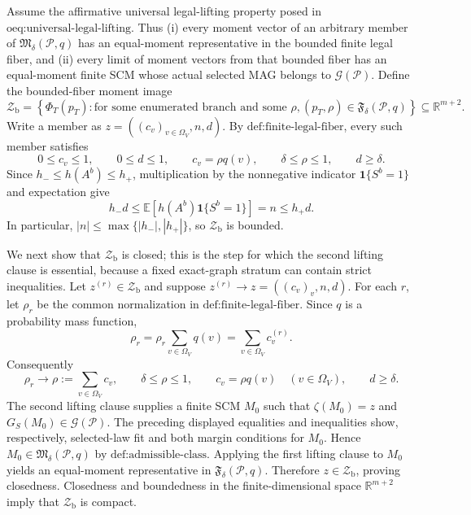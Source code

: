 Assume the affirmative universal legal-lifting property posed in \(\text{oeq:universal-legal-lifting}\).  Thus (i) every moment vector of an arbitrary member of \(\mathfrak M_\delta(\mathcal P,q)\) has an equal-moment representative in the bounded finite legal fiber, and (ii) every limit of moment vectors from that bounded fiber has an equal-moment finite SCM whose actual selected MAG belongs to \(\mathcal G(\mathcal P)\).  Define the bounded-fiber moment image
\[
 \mathcal Z_{\mathrm b}
 =\left\{\Phi_T(p_T):
   \text{for some enumerated branch and some }\rho,
   (p_T,\rho)\in\mathfrak F_\delta(\mathcal P,q)
  \right\}\subseteq\mathbb R^{m+2}.
\]
Write a member as \(z=((c_v)_{v\in\Omega_V},n,d)\).  By \(\text{def:finite-legal-fiber}\), every such member satisfies
\[
 0\le c_v\le1,\qquad 0\le d\le1,
 \qquad c_v=\rho q(v),\qquad \delta\le\rho\le1,
 \qquad d\ge\delta.
\]
Since \(h_-\le h(A^b)\le h_+\), multiplication by the nonnegative indicator \(\mathbf 1\{S^b=1\}\) and expectation give
\[
 h_-d
 \le \mathbb E[h(A^b)\mathbf 1\{S^b=1\}]
 =n
 \le h_+d.
\]
In particular, \(|n|\le\max\{|h_-|,|h_+|\}\), so \(\mathcal Z_{\mathrm b}\) is bounded.

We next show that \(\mathcal Z_{\mathrm b}\) is closed; this is the step for which the second lifting clause is essential, because a fixed exact-graph stratum can contain strict inequalities.  Let \(z^{(r)}\in\mathcal Z_{\mathrm b}\) and suppose \(z^{(r)}\to z=((c_v)_v,n,d)\).  For each \(r\), let \(\rho_r\) be the common normalization in \(\text{def:finite-legal-fiber}\).  Since \(q\) is a probability mass function,
\[
 \rho_r
 =\rho_r\sum_{v\in\Omega_V}q(v)
 =\sum_{v\in\Omega_V}c_v^{(r)}.
\]
Consequently
\[
 \rho_r\longrightarrow
 \rho:=\sum_{v\in\Omega_V}c_v,
 \qquad \delta\le\rho\le1,
 \qquad c_v=\rho q(v)\quad(v\in\Omega_V),
 \qquad d\ge\delta.
\]
The second lifting clause supplies a finite SCM \(M_0\) such that \(\zeta(M_0)=z\) and \(G_S(M_0)\in\mathcal G(\mathcal P)\).  The preceding displayed equalities and inequalities show, respectively, selected-law fit and both margin conditions for \(M_0\).  Hence \(M_0\in\mathfrak M_\delta(\mathcal P,q)\) by \(\text{def:admissible-class}\).  Applying the first lifting clause to \(M_0\) yields an equal-moment representative in \(\mathfrak F_\delta(\mathcal P,q)\).  Therefore \(z\in\mathcal Z_{\mathrm b}\), proving closedness.  Closedness and boundedness in the finite-dimensional space \(\mathbb R^{m+2}\) imply that \(\mathcal Z_{\mathrm b}\) is compact.

